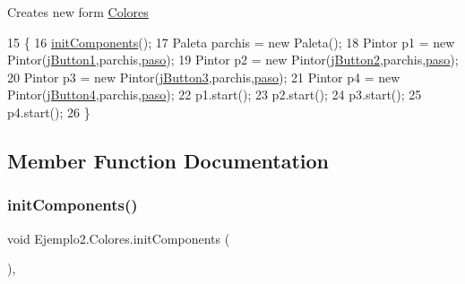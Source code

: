 Creates new form \mbox{\hyperlink{class_ejemplo2_1_1_colores}{Colores}} 
\begin{DoxyCode}
15     \{
16         \mbox{\hyperlink{class_ejemplo2_1_1_colores_a522a4ab17c1c5ec8f6cc59e5eee9ca0d}{initComponents}}();
17         Paleta parchis = \textcolor{keyword}{new} Paleta();
18         Pintor p1 = \textcolor{keyword}{new} Pintor(\mbox{\hyperlink{class_ejemplo2_1_1_colores_a42bfb6444d7ec536cc713e227d90e1ba}{jButton1}},parchis,\mbox{\hyperlink{class_ejemplo2_1_1_colores_acd6cc98bfb842a0c3977d527e740bf24}{paso}});
19         Pintor p2 = \textcolor{keyword}{new} Pintor(\mbox{\hyperlink{class_ejemplo2_1_1_colores_a43f88dce24ac914a20f0f77be8e5bebb}{jButton2}},parchis,\mbox{\hyperlink{class_ejemplo2_1_1_colores_acd6cc98bfb842a0c3977d527e740bf24}{paso}});
20         Pintor p3 = \textcolor{keyword}{new} Pintor(\mbox{\hyperlink{class_ejemplo2_1_1_colores_adbd4afdc65544ac098b878dc8fec5838}{jButton3}},parchis,\mbox{\hyperlink{class_ejemplo2_1_1_colores_acd6cc98bfb842a0c3977d527e740bf24}{paso}});
21         Pintor p4 = \textcolor{keyword}{new} Pintor(\mbox{\hyperlink{class_ejemplo2_1_1_colores_a24dad1da5dc4da01bc9d7de20ac614b5}{jButton4}},parchis,\mbox{\hyperlink{class_ejemplo2_1_1_colores_acd6cc98bfb842a0c3977d527e740bf24}{paso}});
22         p1.start();
23         p2.start();
24         p3.start();
25         p4.start();
26     \}
\end{DoxyCode}


\subsection{Member Function Documentation}
\mbox{\label{class_ejemplo2_1_1_colores_a522a4ab17c1c5ec8f6cc59e5eee9ca0d}} 
\subsubsection{\texorpdfstring{init\+Components()}{initComponents()}}
{\footnotesize\ttfamily void Ejemplo2.\+Colores.\+init\+Components (\begin{DoxyParamCaption}{ }\end{DoxyParamCaption})\hspace{0.3cm}{\ttfamily [inline]}, {\ttfamily [private]}}

